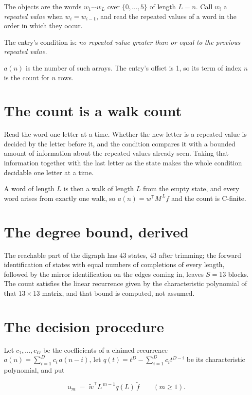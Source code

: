 \documentclass[11pt]{article}
\theoremstyle{definition}
\begin{document}
The objects are the words $w_1\cdots w_L$ over $\{0,\dots,5\}$ of length $L = n$. Call $w_i$ a {\itshape repeated value} when $w_i = w_{i-1}$, and read the repeated values of a word in the order in which they occur.

The entry's condition is: {\itshape no repeated value greater than or equal to the previous repeated value}.

$a(n)$ is the number of such arrays. The entry's offset is 1, so its term of index $n$ is the count for $n$ rows.

\section{The count is a walk count}

Read the word one letter at a time. Whether the new letter is a repeated value is decided by the letter before it, and the condition compares it with a bounded amount of information about the repeated values already seen. Taking that information together with the last letter as the state makes the whole condition decidable one letter at a time.

A word of length $L$ is then a walk of length $L$ from the empty state, and every word arises from exactly one walk, so $a(n) = w^{\mathsf T}M^{\,L}f$ and the count is C-finite.

\section{The degree bound, derived}

The reachable part of the digraph has $43$ states, $43$ after trimming; the forward identification of states with equal numbers of completions of every length, followed by the mirror identification on the edges coming in, leaves $S = 13$ blocks. The count satisfies the linear recurrence given by the characteristic polynomial of that $13\times13$ matrix, and that bound is computed, not assumed.

\section{The decision procedure}

Let $c_1,\dots,c_D$ be the coefficients of a claimed recurrence $a(n) = \sum_{i=1}^{D} c_i\,a(n-i)$, let $q(t) = t^{D} - \sum_{i=1}^{D} c_i t^{D-i}$ be its characteristic polynomial, and put

\[u_m \;=\; \tilde w^{\mathsf T} L^{\,m-1} q(L)\,\tilde f \qquad (m \ge 1).\]
\end{document}
